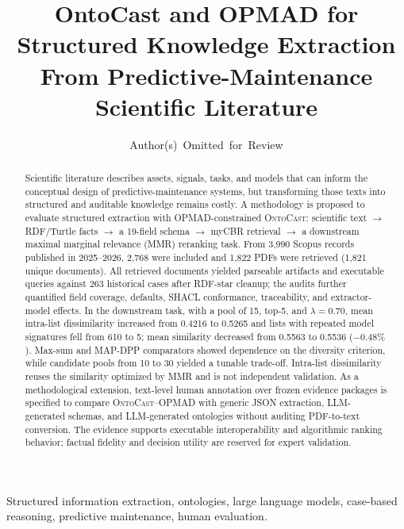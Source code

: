 \documentclass[journal]{IEEEtran}
\title{OntoCast and OPMAD for Structured Knowledge Extraction From Predictive-Maintenance Scientific Literature}
\author{Author(s)~Omitted~for~Review}
\newcommand{\OntoCast}{\textsc{OntoCast}}
\renewcommand{\figurename}{Fig.}
\begin{document}
\renewcommand{\figurename}{Fig.}
\maketitle

\begin{abstract}
Scientific literature describes assets, signals, tasks, and models that can inform the conceptual design of predictive-maintenance systems, but transforming those texts into structured and auditable knowledge remains costly. A methodology is proposed to evaluate structured extraction with OPMAD-constrained \OntoCast{}: scientific text $\rightarrow$ RDF/Turtle facts $\rightarrow$ a 19-field schema $\rightarrow$ myCBR retrieval $\rightarrow$ a downstream maximal marginal relevance (MMR) reranking task. From 3,990 Scopus records published in 2025--2026, 2,768 were included and 1,822 PDFs were retrieved (1,821 unique documents). All retrieved documents yielded parseable artifacts and executable queries against 263 historical cases after RDF-star cleanup; the audits further quantified field coverage, defaults, SHACL conformance, traceability, and extractor-model effects. In the downstream task, with a pool of 15, top-5, and $\lambda=0.70$, mean intra-list dissimilarity increased from 0.4216 to 0.5265 and lists with repeated model signatures fell from 610 to 5; mean similarity decreased from 0.5563 to 0.5536 ($-0.48\%$). Max-sum and MAP-DPP comparators showed dependence on the diversity criterion, while candidate pools from 10 to 30 yielded a tunable trade-off. Intra-list dissimilarity reuses the similarity optimized by MMR and is not independent validation. As a methodological extension, text-level human annotation over frozen evidence packages is specified to compare \OntoCast{}--OPMAD with generic JSON extraction, LLM-generated schemas, and LLM-generated ontologies without auditing PDF-to-text conversion. The evidence supports executable interoperability and algorithmic ranking behavior; factual fidelity and decision utility are reserved for expert validation.

\end{abstract}

\begin{IEEEkeywords}
Structured information extraction, ontologies, large language models, case-based reasoning, predictive maintenance, human evaluation.
\end{IEEEkeywords}

\end{document}
